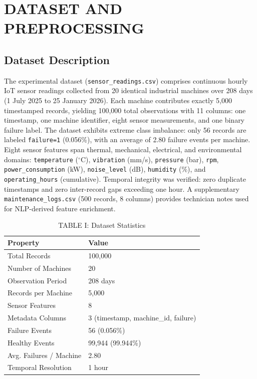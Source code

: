 \documentclass[conference]{IEEEtran}
\begin{document}
\section{DATASET AND PREPROCESSING}

\subsection{Dataset Description}

The experimental dataset (\texttt{sensor\_readings.csv}) comprises continuous hourly IoT sensor readings collected from 20 identical industrial machines over 208 days (1 July 2025 to 25 January 2026). Each machine contributes exactly 5,000 timestamped records, yielding 100,000 total observations with 11 columns: one timestamp, one machine identifier, eight sensor measurements, and one binary failure label. The dataset exhibits extreme class imbalance: only 56 records are labeled \texttt{failure=1} (0.056\%), with an average of 2.80 failure events per machine. Eight sensor features span thermal, mechanical, electrical, and environmental domains: \texttt{temperature} ($^\circ$C), \texttt{vibration} (mm/s), \texttt{pressure} (bar), \texttt{rpm}, \texttt{power\_consumption} (kW), \texttt{noise\_level} (dB), \texttt{humidity} (\%), and \texttt{operating\_hours} (cumulative). Temporal integrity was verified: zero duplicate timestamps and zero inter-record gaps exceeding one hour. A supplementary \texttt{maintenance\_logs.csv} (500 records, 8 columns) provides technician notes used for NLP-derived feature enrichment.

\begin{table}[htbp]
\caption{TABLE I: Dataset Statistics}
\centering
\begin{tabular}{ll}
\hline
\textbf{Property} & \textbf{Value} \\
\hline
Total Records & 100,000 \\
Number of Machines & 20 \\
Observation Period & 208 days \\
Records per Machine & 5,000 \\
Sensor Features & 8 \\
Metadata Columns & 3 (timestamp, machine\_id, failure) \\
Failure Events & 56 (0.056\%) \\
Healthy Events & 99,944 (99.944\%) \\
Avg. Failures / Machine & 2.80 \\
Temporal Resolution & 1 hour \\
\hline
\end{tabular}
\label{tab:dataset_stats}
\end{table}
\end{document}
